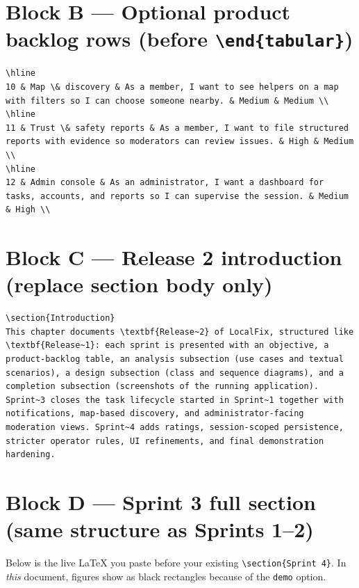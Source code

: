 \documentclass[11pt,a4paper]{article}
\begin{document}
\section{Block B --- Optional product backlog rows (before \texttt{\textbackslash end\{tabular\}})}
\begin{verbatim}
\hline
10 & Map \& discovery & As a member, I want to see helpers on a map with filters so I can choose someone nearby. & Medium & Medium \\
\hline
11 & Trust \& safety reports & As a member, I want to file structured reports with evidence so moderators can review issues. & High & Medium \\
\hline
12 & Admin console & As an administrator, I want a dashboard for tasks, accounts, and reports so I can supervise the session. & Medium & High \\
\end{verbatim}

\section{Block C --- Release 2 introduction (replace section body only)}
\begin{verbatim}
\section{Introduction}
This chapter documents \textbf{Release~2} of LocalFix, structured like \textbf{Release~1}: each sprint is presented with an objective, a product-backlog table, an analysis subsection (use cases and textual scenarios), a design subsection (class and sequence diagrams), and a completion subsection (screenshots of the running application). Sprint~3 closes the task lifecycle started in Sprint~1 together with notifications, map-based discovery, and administrator-facing moderation views. Sprint~4 adds ratings, session-scoped persistence, stricter operator rules, UI refinements, and final demonstration hardening.
\end{verbatim}

\section{Block D --- Sprint 3 full section (same structure as Sprints 1--2)}
Below is the live \LaTeX{} you paste before your existing \texttt{\textbackslash section\{Sprint 4\}}. In \emph{this} document, figures show as black rectangles because of the \texttt{demo} option.
\end{document}
